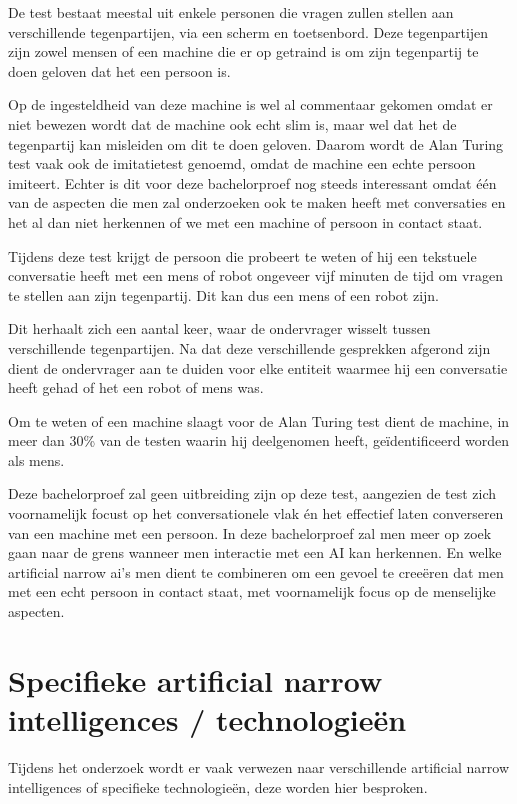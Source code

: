 De test bestaat meestal uit enkele personen die vragen zullen stellen aan verschillende tegenpartijen, via een scherm en toetsenbord. Deze tegenpartijen zijn zowel mensen of een machine die er op getraind is om zijn tegenpartij te doen geloven dat het een persoon is. 

Op de ingesteldheid van deze machine is wel al commentaar gekomen omdat er niet bewezen wordt dat de machine ook echt slim is, maar wel dat het de tegenpartij kan misleiden om dit te doen geloven. Daarom wordt de Alan Turing test vaak ook de imitatietest genoemd, omdat de machine een echte persoon imiteert. Echter is dit voor deze bachelorproef nog steeds interessant omdat één van de aspecten die men zal onderzoeken ook te maken heeft met conversaties en het al dan niet herkennen of we met een machine of persoon in contact staat. 

Tijdens deze test krijgt de persoon die probeert te weten of hij een tekstuele conversatie heeft met een mens of robot ongeveer vijf minuten de tijd om vragen te stellen aan zijn tegenpartij. Dit kan dus een mens of een robot zijn. 

Dit herhaalt zich een aantal keer, waar de ondervrager wisselt tussen verschillende tegenpartijen. Na dat deze verschillende gesprekken afgerond zijn dient de ondervrager aan te duiden voor elke entiteit waarmee hij een conversatie heeft gehad of het een robot of mens was.

Om te weten of een machine slaagt voor de Alan Turing test dient de machine, in meer dan 30\% van de testen waarin hij deelgenomen heeft, geïdentificeerd worden als mens. 

Deze bachelorproef zal geen uitbreiding zijn op deze test, aangezien de test zich voornamelijk focust op het conversationele vlak én het effectief laten converseren van een machine met een persoon. In deze bachelorproef zal men meer op zoek gaan naar de grens wanneer men interactie met een AI kan herkennen. En welke artificial narrow ai's men dient te combineren om een gevoel te creeëren dat men met een echt persoon in contact staat, met voornamelijk focus op de menselijke aspecten.

\section{Specifieke artificial narrow intelligences / technologieën}

Tijdens het onderzoek wordt er vaak verwezen naar verschillende artificial narrow intelligences of specifieke technologieën, deze worden hier besproken.

